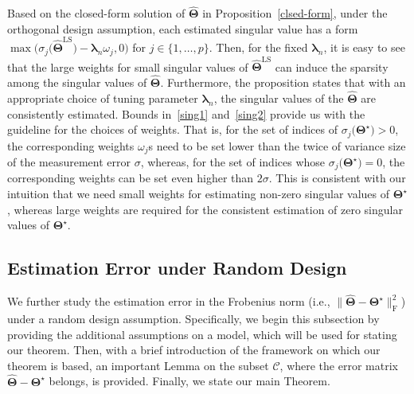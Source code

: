 \documentclass[alpha-refs]{wiley-article}
\begin{document}
Based on the closed-form solution of $\widehat{\boldsymbol{\Theta}}$ in Proposition~\ref{clsed-form}, under the orthogonal design assumption, each estimated singular value has a form $\max \big( \sigma_{j}\big(\widehat{\boldsymbol{\Theta}}^{\text{LS}}\big)-\boldsymbol{\lambda}_{n} \omega_{j},0 \big)$ for $j\in\{1,\dots,p\}$.
Then, for the fixed $\boldsymbol{\lambda}_{n}$, it is easy to see that the large weights for small singular values of $\widehat{\boldsymbol{\Theta}}^{\text{LS}}$ can induce the sparsity among the singular values of $\widehat{\boldsymbol{\Theta}}$.
Furthermore, the proposition states that with an appropriate choice of tuning parameter $\boldsymbol{\lambda}_{n}$, the singular values of the $\widehat{\boldsymbol{\Theta}}$ are consistently estimated.
Bounds in~\eqref{sing1} and~\eqref{sing2} provide us with the guideline for the choices of weights.
That is, for the set of indices of $\sigma_{j}\big(\boldsymbol{\Theta}^{\star}\big)>0$, the corresponding weights $\omega_{j}$s need to be set lower than the twice of variance size of the measurement error $\sigma$, whereas, for the set of indices whose $\sigma_{j}\big(\boldsymbol{\Theta}^{\star}\big)=0$, the corresponding weights can be set even higher than $2\sigma$.
This is consistent with our intuition that we need small weights for estimating non-zero singular values of $\boldsymbol{\Theta}^{\star}$, whereas large weights are required for the consistent estimation of zero singular values of $\boldsymbol{\Theta}^{\star}$.

\subsection{Estimation Error under Random Design}
We further study the estimation error in the Frobenius norm (i.e., $\| \widehat{\boldsymbol{\Theta}} - \boldsymbol{\Theta^{\star}} \|_{\text{F}}^{2}$)  under a random design assumption.
Specifically, we begin this subsection by providing the additional assumptions on a model, which will be used for stating our theorem.
Then, with a brief introduction of the framework on which our theorem is based, an important Lemma on the subset $\mathcal{C}$, where the error matrix $\widehat{\boldsymbol{\Theta}}-\boldsymbol{\Theta^{\star}}$ belongs, is provided.
Finally, we state our main Theorem.
\end{document}
